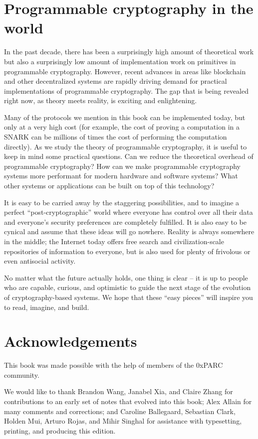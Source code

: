 \section{Programmable cryptography in the world}

In the past decade, there has been a surprisingly high amount of
theoretical work but also a surprisingly low amount of implementation
work on primitives in programmable cryptography. However, recent
advances in areas like blockchain and other decentralized systems are
rapidly driving demand for practical implementations of programmable
cryptography. The gap that is being revealed right now, as theory meets
reality, is exciting and enlightening.

Many of the protocols we mention in this book can be implemented today,
but only at a very high cost (for example, the cost of proving a
computation in a SNARK can be millions of times the cost of performing
the computation directly). As we study the theory of programmable
cryptography, it is useful to keep in mind some practical questions. Can
we reduce the theoretical overhead of programmable cryptography? How can
we make programmable cryptography systems more performant for modern
hardware and software systems? What other systems or applications can be
built on top of this technology?

It is easy to be carried away by the staggering possibilities, and to
imagine a perfect ``post-cryptographic'' world where everyone has
control over all their data and everyone's security preferences are
completely fulfilled. It is also easy to be cynical and assume that
these ideas will go nowhere. Reality is always somewhere in the middle;
the Internet today offers free search and civilization-scale
repositories of information to everyone, but is also used for plenty of
frivolous or even antisocial activity.

No matter what the future actually holds, one thing is clear -- it is up
to people who are capable, curious, and optimistic to guide the next
stage of the evolution of cryptography-based systems. We hope that these
``easy pieces'' will inspire you to read, imagine, and build.

\section{Acknowledgements}

This book was made possible with the help of members of the 0xPARC community.

We would like to thank Brandon Wang, Janabel Xia, and Claire Zhang for
contributions to an early set of notes that evolved into this book; Alex
Allain for many comments and corrections; and Caroline Ballegaard, Sebastian
Clark, Holden Mui, Arturo Rojas, and Mihir Singhal for assistance with
typesetting, printing, and producing this edition.
